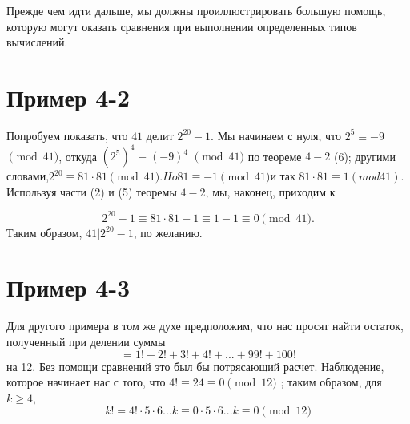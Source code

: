 \documentclass[11pt]{article}
\begin{document}
	Прежде чем идти дальше, мы должны проиллюстрировать большую помощь, которую могут оказать сравнения при выполнении определенных типов вычислений.
	\section{Пример 4-2}
	Попробуем показать, что $41$ делит $2^{20} -1$. Мы начинаем с нуля, что $2^{5} \equiv - 9$ $\pmod{41}$, откуда $(2^{5})^{4} \equiv (- 9)^{4}$ $\pmod{41}$ по теореме $4-2$ (6); другими словами,$ 2^{20} \equiv 81 \cdot 81 \pmod{41}. Ho 81 \equiv - 1 \pmod{41} $и так $81 \cdot 81 \equiv 1 (mod 41).$ Используя части (2) и (5) теоремы $4-2$, мы, наконец, приходим к
	
	\[
		2^{20}-1 \equiv 81 \cdot 81-1 \equiv 1-1 \equiv 0 \pmod{41}.
	\]
	Таким образом, $41 | 2^{20}-1$, по желанию.
	\section{Пример 4-3}
	Для другого примера в том же духе предположим, что нас просят найти остаток, полученный при делении суммы
	\[=
		1! +2! +3! +4! + ... + 99! +100!
	\]
	на 12. Без помощи сравнений это был бы потрясающий расчет. Наблюдение, которое начинает нас с того, что $4! \equiv 24 \equiv 0 \pmod{12}$ ; таким образом, для $k\geq 4$,
	\[
		k! = 4! \cdot 5 \cdot 6 ... k \equiv 0 \cdot 5 \cdot 6 ... k \equiv 0
		\pmod{12}	\]
		
		

	
	
	
\end{document}
